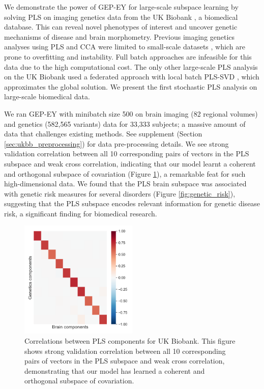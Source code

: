 We demonstrate the power of GEP-EY for large-scale subspace learning by solving PLS on imaging genetics data from the UK Biobank \citep{sudlow2015uk}, a biomedical database.
This can reveal novel phenotypes of interest and uncover genetic mechanisms of disease and brain morphometry.
Previous imaging genetics analyses using PLS and CCA were limited to small-scale datasets \citep{Lorenzi2018,Taquet2021,Lefloch2012}, which are prone to overfitting and instability.
Full batch approaches are infeasible for this data due to the high computational cost.
The only other large-scale PLS analysis on the UK Biobank used a federated approach with local batch PLS-SVD \citep{lorenzi2016}, which approximates the global solution.
We present the first stochastic PLS analysis on large-scale biomedical data.

We ran GEP-EY with minibatch size 500 on brain imaging (82 regional volumes) and genetics (582,565 variants) data for 33,333 subjects; a massive amount of data that challenges existing methods.
See supplement (Section \ref{sec:ukbb_preprocessing}) for data pre-processing details.
We see strong validation correlation between all 10 corresponding pairs of vectors in the PLS subspace and weak cross correlation, indicating that our model learnt a coherent and orthogonal subspace of covariation (Figure \ref{fig:UKBB_corr}), a remarkable feat for such high-dimensional data.
We found that the PLS brain subspace was associated with genetic risk measures for several disorders (Figure \ref{fig:genetic_risk}), suggesting that the PLS subspace encodes relevant information for genetic disease risk, a significant finding for biomedical research.


\begin{figure}
    \centering
    \includegraphics[width=0.5\textwidth,trim={0.8cm 0cm 0.3cm 0cm}]{figures/gradient_descent/UKBB/cross_corr}
    \caption{Correlations between PLS components for UK Biobank. This figure shows strong validation correlation between all 10 corresponding pairs of vectors in the PLS subspace and weak cross correlation, demonstrating that our model has learned a coherent and orthogonal subspace of covariation.}
    \label{fig:UKBB_corr}
\end{figure}

